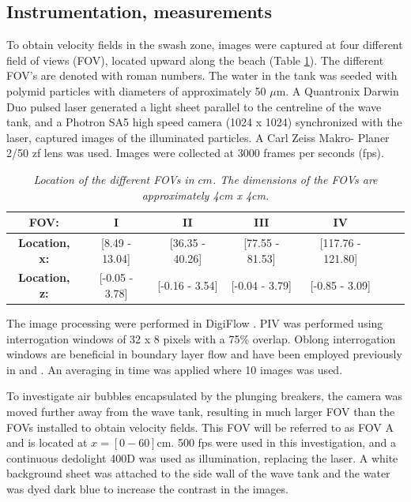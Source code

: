 \documentclass[a4paper, 11pt, english, twoside, openright]{article}
\begin{document}
\subsection{Instrumentation, measurements}
To obtain velocity fields in the swash zone, images were captured at four different field of views (FOV), located upward along the beach (Table \ref{tab:loc}). The different FOV's are denoted with roman numbers. The water in the tank was seeded with polymid particles with diameters of approximately 50 $\mu$m. A Quantronix Darwin Duo pulsed laser generated a light sheet parallel to the centreline of the wave tank, and a Photron SA5 high speed camera (1024 x 1024) synchronized with the laser, captured images of the illuminated particles. A Carl Zeiss Makro- Planer 2/50 zf lens was used. Images were collected at 3000 frames per seconds (fps).
 \begin{table}[]
 \centering
\caption{\textit{Location of the different FOVs  in $cm$. The dimensions of the FOVs are approximately 4cm x 4cm.}}
\begin{tabular}{|c|c|c|c|c|c|c|}
\hline
\textbf{FOV:}      & I                   & II                 & III     & IV \\ \hline
\textbf{Location, x:}& {[}8.49 - 13.04{]} & {[}36.35 - 40.26{]} & {[}77.55 - 81.53{]} & {[}117.76 - 121.80{]} 
 \\ \hline
\textbf{Location, z:}&  {[}-0.05 - 3.78{]} & {[}-0.16 - 3.54{]} & {[}-0.04 - 3.79{]} & {[}-0.85 - 3.09{]} 
\\ \hline
\end{tabular}
\label{tab:loc}
\end{table}
The image processing were performed in DigiFlow \citep{digiflow}. PIV was performed using interrogation windows of 32 x 8 pixels with a 75\% overlap. Oblong interrogation windows are beneficial in boundary layer flow and have been employed previously in \cite{Liu...} and \cite{pedersen2013runup}. An averaging in time was applied where 10 images was used.

To investigate air bubbles encapsulated by the plunging breakers, the camera was moved further away from the wave tank, resulting in much larger FOV than the FOVs installed to obtain velocity fields. This FOV will be referred to as FOV A and is located at $x=[0-60]$cm.  500 fps were used in this investigation, and a continuous dedolight 400D was used as illumination, replacing the laser. A white background sheet was attached to the side wall of  the wave tank and the water was dyed dark blue to increase the contrast in the images.
\end{document}
